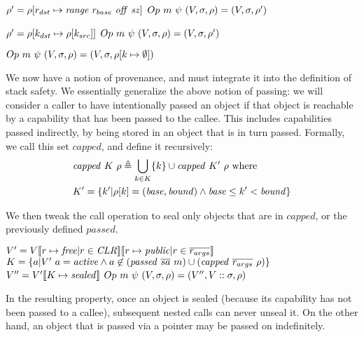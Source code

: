 \documentclass[10pt,conference]{ieeetran}%
\theoremstyle{definition}
\begin{document}
           {\(\rho' = \rho[r_{dst} \mapsto \mathit{range} ~ r_{base} ~ \mathit{off} ~ \mathit{sz}]\)}
           {\(Op ~ m ~ \psi ~ (V,\sigma,\rho) = (V,\sigma,\rho')\)}

           {\(\rho' = \rho[k_{dst} \mapsto \rho[k_{src}]]\)}
           {\(Op ~ m ~ \psi ~ (V,\sigma,\rho) = (V,\sigma,\rho')\)}

         {\(Op ~ m ~ \psi ~ (V,\sigma,\rho) = (V,\sigma,\rho[k \mapsto \emptyset])\)}

We now have a notion of provenance, and must integrate it into the definition of
stack safety. We essentially generalize the above notion of passing: we will consider
a caller to have intentionally passed an object if that object is reachable by
a capability that has been passed to the callee. This includes capabilities passed
indirectly, by being stored in an object that is in turn passed. Formally, we call
this set \(\mathit{capped}\), and define it recursively:
%
\[\begin{split}
& \mathit{capped} ~ K ~ \rho \triangleq \bigcup_{k \in K} \{k\} \cup \mathit{capped} ~ K' ~ \rho \textnormal{ where} \\
& K' = \{k' |\rho[k] = (\mathit{base},\mathit{bound})
\land \mathit{base} \leq k' < \mathit{bound}\} \\
\end{split}\]

We then tweak the call operation to seal only objects that are in \(\mathit{capped}\), or
the previously defined \(\mathit{passed}\).

               {\(V' = V \llbracket r \mapsto \mathit{free} | r \in \mathit{CLR} \rrbracket
                 \llbracket r \mapsto \mathit{public} | r \in \overline{r_{args}} \rrbracket\)}
               {\(K = \{a | V' ~ a = \mathit{active} \land a \not \in (\mathit{passed} ~ \overline{sa} ~ m) \cup (\mathit{capped} ~ \overline{r_{args}} ~ \rho) \}\)}
               {\(V'' = V'\llbracket K \mapsto \mathit{sealed} \rrbracket\)}
               {\(Op ~ m ~ \psi ~ (V,\sigma,\rho) =
                 (V'',V::\sigma,\rho)\)}

In the resulting property, once an object is sealed (because its
capability has not been passed to a callee), subsequent nested calls can never unseal it.
On the other hand, an object that is passed via a pointer may be passed on indefinitely.
\end{document}
